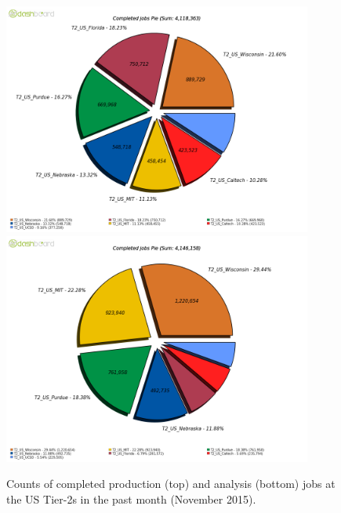 \documentclass[11pt,a4paper]{article}
\begin{document}
\begin{figure}
\begin{center}
\includegraphics[height=3in]{productionJobsAtUST2sInOneMonth.png}
\includegraphics[height=3in]{analysisJobsAtUST2sInOneMonth.png}
\label{computingJobsAtUST2sInOneMonth}
\end{center}
\caption{Counts of completed production (top) and analysis (bottom) 
jobs at the US Tier-2s in the past month (November 2015).}
\end{figure}
\end{document}
